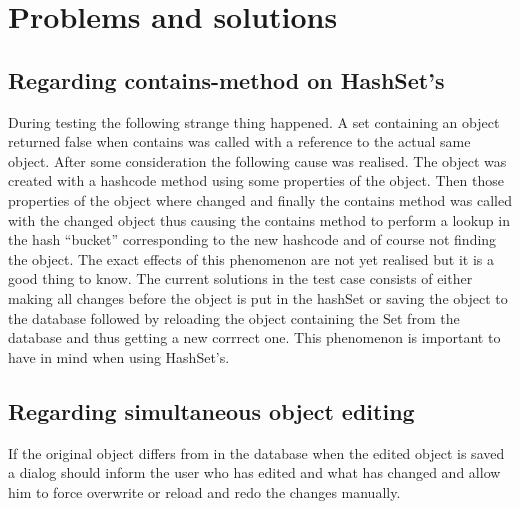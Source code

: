 \documentclass[a4paper,10pt]{article}
\begin{document}
	\section{Problems and solutions} 
    \begin{multicols}{2}
        \subsection{Regarding contains-method on HashSet's} During testing the
            following strange thing happened. A set containing an object
            returned false when contains was called with a reference to the
            actual same object. After some consideration the following cause
            was realised. The object was created with a hashcode method using
            some properties of the object. Then those properties of the object
            where changed and finally the contains method was called with the
            changed object thus causing the contains method to perform a lookup
            in the hash ``bucket'' corresponding to the new hashcode and of
            course not finding the object.  The exact effects of this
            phenomenon are not yet realised but it is a good thing to know. The
            current solutions in the test case consists of either making all
            changes before the object is put in the hashSet or saving the
            object to the database followed by reloading the object containing
            the Set from the database and thus getting a new corrrect one.
            This phenomenon is important to have in mind when using HashSet's.

        \subsection{Regarding simultaneous object editing}
            If the original object differs from in the database when the edited
            object is saved a dialog should inform the user who has edited and
            what has changed and allow him to force overwrite or reload and
            redo the changes manually.
    \end{multicols}        
\end{document}
